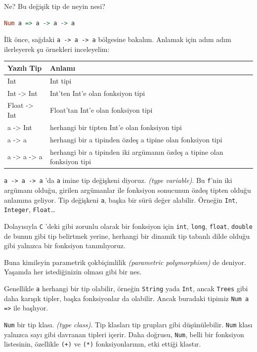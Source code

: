 \documentclass[a4paper,14pt,openany]{extbook} %
\let\emph\textit
\begin{document}
Ne? Bu değişik tip de neyin nesi?

\begin{lstlisting}[language=Haskell]
  Num a => a -> a -> a
\end{lstlisting}

İlk önce, sağdaki \lstinline!a -> a -> a! bölgesine bakalım. Anlamak için
adım adım ilerleyerek şu örnekleri inceleyelim:

\begin{longtable}[l]{@{}ll@{}} %
  \toprule
  Yazılı Tip & Anlamı\tabularnewline
  \midrule
  \endhead
  Int & Int tipi\tabularnewline
  Int -\textgreater{} Int & Int'ten Int'e olan fonksiyon
  tipi\tabularnewline
  Float -\textgreater{} Int & Float'tan Int'e olan fonksiyon
  tipi\tabularnewline
  a -\textgreater{} Int & herhangi bir tipten Int'e olan fonksiyon
  tipi\tabularnewline
  a -\textgreater{} a & herhangi bir a tipinden özdeş a tipine olan
  fonksiyon tipi\tabularnewline
  a -\textgreater{} a -\textgreater{} a & herhangi bir a tipinden iki
  argümanın özdeş a tipine olan fonksiyon tipi\tabularnewline
  \bottomrule
\end{longtable}

\lstinline!a -> a -> a! 'da \lstinline!a! imine tip değişkeni
diyoruz. \emph{(type variable)}. Bu \lstinline!f!'nin iki argümanı
olduğu, girilen argümanlar ile fonksiyon sonucunun özdeş tipten olduğu
anlamına geliyor. Tip değişkeni \lstinline!a!, başka bir sürü değer
alabilir. Örneğin \lstinline!Int!, \lstinline!Integer!,
\lstinline!Float!\ldots{}

Dolayısıyla \lstinline!C! 'deki gibi zorunlu olarak bir fonksiyon için
\lstinline!int!, \lstinline!long!, \lstinline!float!, \lstinline!double!
de bunun gibi tip belirtmek yerine, herhangi bir dinamik tip tabanlı dilde
olduğu gibi yalnızca bir fonksiyon tanımlıyoruz.

Buna kimileyin parametrik çokbiçimlilik \emph{(parametric polymorphism)} de
deniyor. Yaşamda her istediğinizin olması gibi bir nes.

Genellikle \lstinline!a! herhangi bir tip olabilir, örneğin
\lstinline!String! yada \lstinline!Int!, ancak \lstinline!Trees! gibi daha
karışık tipler, başka fonksiyonlar da olabilir. Ancak buradaki tipimiz
\lstinline!Num a =>! ile başlıyor.

\lstinline!Num! bir tip klası. \emph{(type class)}. Tip klasları tip
grupları gibi düşünülebilir. \lstinline!Num! klası yalnızca sayı gibi
davranan tipleri içerir. Daha doğrusu, \lstinline!Num!, belli bir
fonksiyon listesinin, özellikle \lstinline!(+)! ve \lstinline!(*)!
fonksiyonlarının, etki ettiği klastır.
\end{document}
